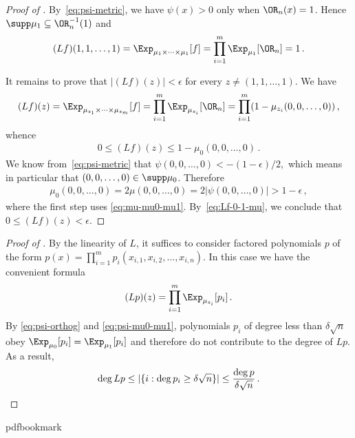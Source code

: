 \begin{proof}[Proof of ]
By~\eqref{eq:psi-metric}, we have $\psi(x)>0$ only when $\OR_n(x)=1$.
Hence $\supp\mu_1\subseteq\OR_n^{-1}(1)$ and
\begin{align*}
(Lf)(1,1,\dots,1)
   =\Exp_{\mu_1\times\cdots\times\mu_1}[f]
   =\prod_{i=1}^m\Exp_{\mu_1}[\OR_n]=1\,.
\end{align*}
 
 
It remains to prove that $|(Lf)(z)|<\epsilon$ for every $z\ne(1,1,\dots,1)$.
We have
\begin{align*}
(Lf)(z)
  =\Exp_{\mu_{z_1}\times\cdots\times\mu_{z_m}}[f]
  =\prod_{i=1}^m\Exp_{\mu_{z_i}}[\OR_n]
  =\prod_{i=1}^m(1-\mu_{z_i}(0,0,\dots,0))\,,
\end{align*}
whence
\begin{align}
0\leq(Lf)(z)\leq1-\mu_0(0,0,\dots,0)\,.\label{eq:Lf-0-1-mu}
\end{align}
We know from~\eqref{eq:psi-metric} that $\psi(0,0,\dots,0)<-(1-\epsilon)/2,$
which means in particular that $(0,0,\dots,0)\in\supp\mu_0$. Therefore
\begin{align*}
\mu_0(0,0,\dots,0)
  =2\mu(0,0,\dots,0)
  =2|\psi(0,0,\dots,0)|
  >1-\epsilon\,,
\end{align*}
where the first step uses \eqref{eq:mu-mu0-mu1}. By~\eqref{eq:Lf-0-1-mu},
we conclude that $0\leq(Lf)(z)<\epsilon$.
\end{proof}
 
\begin{proof}[Proof of ]
By the linearity of $L$, it suffices to consider factored polynomials
$p$ of the form $p(x)=\prod_{i=1}^mp_i(x_{i,1},x_{i,2},\dots,x_{i,n})$.
In this case we have the convenient formula
\begin{align*}
(Lp)(z)=\prod_{i=1}^m\Exp_{\mu_{z_i}}[p_i]\,.
\end{align*}
By \eqref{eq:psi-orthog} and \eqref{eq:psi-mu0-mu1}, polynomials
$p_i$ of degree less than $\delta\sqrt{n}$ obey 
$\Exp_{\mu_0}[p_i]=\Exp_{\mu_1}[p_i]$
and therefore do not contribute to the degree of $Lp$. As a result,
\[
\deg Lp\leq|\{i:\deg p_i\geq\delta\sqrt{n}\}|
   \leq\frac{\deg p}{\delta\sqrt{n}}\,.\qedhere
\]
\end{proof}

%
%
%
%
%
\providecommand{\bibhead}[1]{}
%
\expandafter\ifx\csname pdfbookmark\endcsname\relax%
  \providecommand{\tocrefpdfbookmark}{}
\else\providecommand{\tocrefpdfbookmark}{%
   \hypertarget{tocreferences}{}%
   \pdfbookmark[1]{References}{tocreferences}}%
\fi

